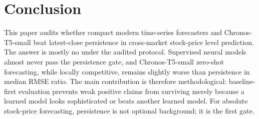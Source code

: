 \documentclass[11pt]{article}
\begin{document}
\section{Conclusion}

This paper audits whether compact modern time-series forecasters and Chronos-T5-small beat latest-close persistence in cross-market stock-price level prediction. The answer is mostly no under the audited protocol. Supervised neural models almost never pass the persistence gate, and Chronos-T5-small zero-shot forecasting, while locally competitive, remains slightly worse than persistence in median RMSE ratio. The main contribution is therefore methodological: baseline-first evaluation prevents weak positive claims from surviving merely because a learned model looks sophisticated or beats another learned model. For absolute stock-price forecasting, persistence is not optional background; it is the first gate.
\end{document}
